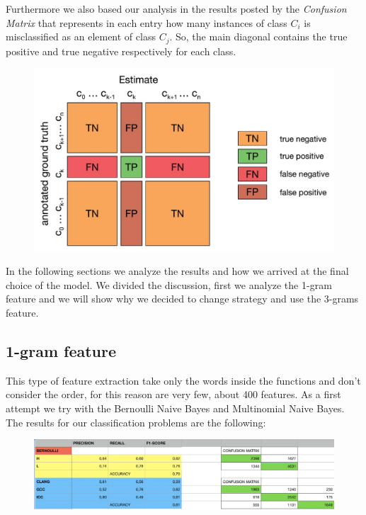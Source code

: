 \documentclass[12pt]{article}
\begin{document}
Furthermore we also based our analysis in the results posted by the {\em Confusion Matrix} that represents in each entry how many instances of class $C_i$
is misclassified as an element of class $C_j$. So, the main diagonal contains the true positive and true negative respectively for each class.
\begin{figure}[!ht]
  \includegraphics[width=1\textwidth]{pic2}
  \label{fig: Confusion Matrix}
\end{figure}
\newpage

In the following sections we analyze the results and how we arrived at the final choice of the model. We divided the discussion, first we analyze the 1-gram feature and we will show why we decided to change strategy and use the 3-grams feature.

\subsection{1-gram feature}
This type of feature extraction take only the words inside the functions and don't consider the order, for this reason are very few, about 400 features. As a first attempt we try with the Bernoulli Naive Bayes and Multinomial Naive Bayes. The results for our classification problems are the following:
\begin{figure}[!ht]
  \includegraphics[width=1\textwidth]{pic3}
  \label{fig: Bernoulli with 1-gram}
\end{figure}
\end{document}
